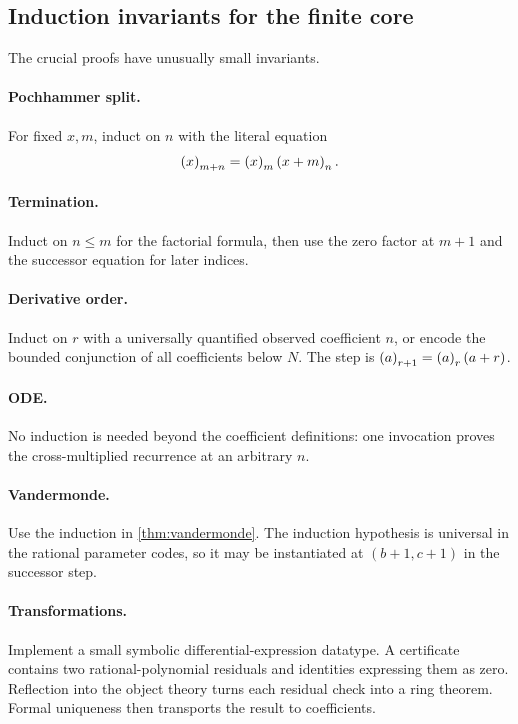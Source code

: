 \subsection{Induction invariants for the finite core}

The crucial proofs have unusually small invariants.

\paragraph{Pochhammer split.}
For fixed \(x,m\), induct on \(n\) with the literal equation
\[
 \left(x\right)_{m+n}=\left(x\right)_{m}\left(x+m\right)_{n}.
\]

\paragraph{Termination.}
Induct on \(n\le m\) for the factorial formula, then use the zero factor at
\(m+1\) and the successor equation for later indices.

\paragraph{Derivative order.}
Induct on \(r\) with a universally quantified observed coefficient \(n\), or
encode the bounded conjunction of all coefficients below \(N\).  The step is
\(\left(a\right)_{r+1}=\left(a\right)_{r}(a+r)\).

\paragraph{ODE.}
No induction is needed beyond the coefficient definitions: one
 invocation proves the cross-multiplied recurrence at an
arbitrary \(n\).

\paragraph{Vandermonde.}
Use the induction in \cref{thm:vandermonde}.  The induction hypothesis is
universal in the rational parameter codes, so it may be instantiated at
\((b+1,c+1)\) in the successor step.

\paragraph{Transformations.}
Implement a small symbolic differential-expression datatype.  A certificate
contains two rational-polynomial residuals and identities expressing them as
zero.  Reflection into the object theory turns each residual check into a
ring theorem.  Formal uniqueness then transports the result to coefficients.

